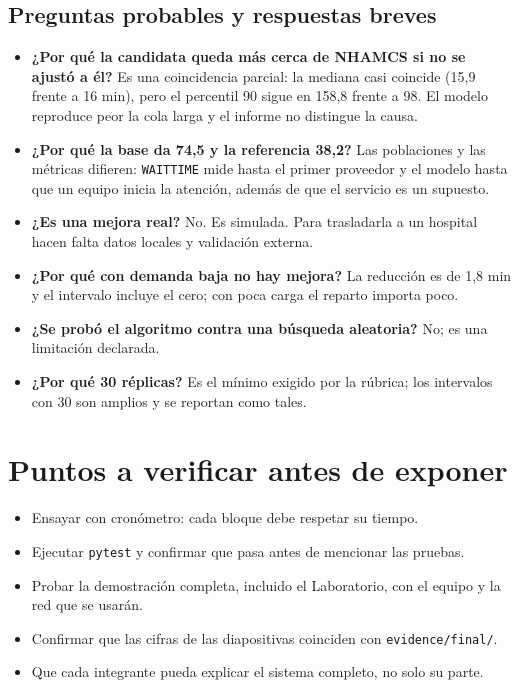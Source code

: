 \documentclass[11pt,a4paper]{article}
\begin{document}
\subsection*{Preguntas probables y respuestas breves}
\begin{itemize}[leftmargin=*]
\item \textbf{¿Por qué la candidata queda más cerca de NHAMCS si no se ajustó a él?} Es una coincidencia parcial: la mediana casi coincide (15,9 frente a 16 min), pero el percentil 90 sigue en 158,8 frente a 98. El modelo reproduce peor la cola larga y el informe no distingue la causa.
\item \textbf{¿Por qué la base da 74,5 y la referencia 38,2?} Las poblaciones y las métricas difieren: \texttt{WAITTIME} mide hasta el primer proveedor y el modelo hasta que un equipo inicia la atención, además de que el servicio es un supuesto.
\item \textbf{¿Es una mejora real?} No. Es simulada. Para trasladarla a un hospital hacen falta datos locales y validación externa.
\item \textbf{¿Por qué con demanda baja no hay mejora?} La reducción es de 1,8 min y el intervalo incluye el cero; con poca carga el reparto importa poco.
\item \textbf{¿Se probó el algoritmo contra una búsqueda aleatoria?} No; es una limitación declarada.
\item \textbf{¿Por qué 30 réplicas?} Es el mínimo exigido por la rúbrica; los intervalos con 30 son amplios y se reportan como tales.
\end{itemize}

\section*{Puntos a verificar antes de exponer}
\begin{itemize}[leftmargin=*]
\item Ensayar con cronómetro: cada bloque debe respetar su tiempo.
\item Ejecutar \texttt{pytest} y confirmar que pasa antes de mencionar las pruebas.
\item Probar la demostración completa, incluido el Laboratorio, con el equipo y la red que se usarán.
\item Confirmar que las cifras de las diapositivas coinciden con \texttt{evidence/final/}.
\item Que cada integrante pueda explicar el sistema completo, no solo su parte.
\end{itemize}
\end{document}
